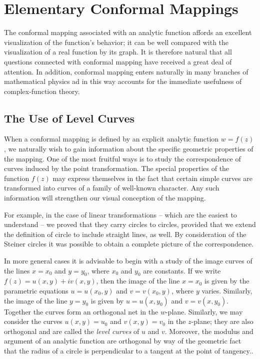 \chapter{Elementary Conformal Mappings}
\label{chap:elementary-conformal-mappings}

The conformal mapping associated with an analytic function affords an excellent visualization of the function's behavior; it can be well compared with the visualization of a real function by its graph. It is therefore natural that all questions connected with conformal mapping have received a great deal of attention. In addition, conformal mapping enters naturally in many branches of mathematical physics ad in this way accounts for the immediate usefulness of complex-function theory.

\section{The Use of Level Curves}
When a conformal mapping is defined by an explicit analytic function $w=f(z)$, we naturally wish to gain information about the specific geometric properties of the mapping. One of the most fruitful ways is to study the correspondence of curves induced by the point transformation. The special properties of the function $f(z)$ may express themselves in the fact that certain simple curves are transformed into curves of a family of well-known character. Any such information will strengthen our visual conception of the mapping.

For example, in the case of linear transformations -- which are the easiest to understand -- we proved that they carry circles to circles, provided that we extend the definition of circle to include straight lines, as well. By consideration of the Steiner circles it was possible to obtain a complete picture of the correspondence.

In more general cases it is advisable to begin with a study of the image curves of the lines $x=x_0$ and $y=y_0$, where $x_0$ and $y_0$ are constants. If we write $f(z)=u(x,y)+iv(x,y)$, then the image of the line $x=x_0$ is given by the parametric equations $u=u(x_0,y)$ and $v=v(x_0,y)$, where $y$ varies. Similarly, the image of the line $y=y_0$ is given by $u=u(x,y_0)$ and $v=v(x,y_0)$. Together the curves form an orthogonal net in the $w$-plane. Similarly, we may consider the curves $u(x,y)=u_0$ and $v(x,y)=v_0$ in the $z$-plane; they are also orthogonal and are called the \emph{level curves} of $u$ and $v$. Moreover, the modulus and argument of an analytic function are orthogonal by way of the geometric fact that the radius of a circle is perpendicular to a tangent at the point of tangency..

